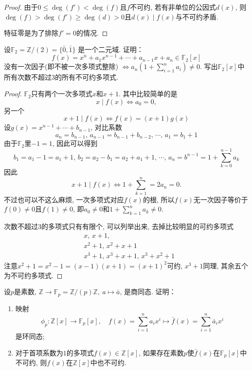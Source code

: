 \documentclass{../solutions-cn}
\begin{document}
\begin{proof}
    由于$0 \leqslant \deg(f') < \deg(f)$且$f$不可约, 若有非单位的公因式$d(x)$, 则$\deg(f) > \deg(f') \geqslant \deg(d) > 0$且$d(x) \mid f(x)$与不可约矛盾.

    特征零是为了排除$f' = 0$的情况.
\end{proof}

\begin{exercise}[习题2.3.5]
    设$\mathbb{F}_2 = \mathbb{Z}/(2) = \{\bar{0}, \bar{1}\}$
是一个二元域. 证明：
\[
    f(x) = x^n + a_1x^{n - 1} + \cdots + a_{n - 1}x + a_n \in \mathbb{F}_2[x]
\]
没有一次因子(即不被一次多项式整除)
\(
    \Leftrightarrow a_n\left(1 + \sum_{i = 1}^n a_i\right) \neq 0.
\)
写出$\mathbb{F}_2[x]$中所有次数不超过$3$的所有不可约多项式.
\end{exercise}

\begin{proof}
    $\mathbb{F}_2$只有两个一次多项式$x$和$x + 1$. 其中比较简单的是
    \[
        x \mid f(x) \iff a_0 = 0,
    \]
    另一个
    \[
        x + 1 \mid f(x) \iff f(x) = (x + 1)g(x)
    \]
    设$g(x) = x^{n - 1} + \cdots + b_{n - 1}$, 对比系数
    \[
        a_n = b_{n - 1},\, a_{n - 1} = b_{n - 1} + b_{n - 2},\, \cdots,\, a_{1} = b_1 + 1
    \]
    由于$\mathbb{F}_2$里$-1 = 1$, 因此可以得到
    \[
        b_1 = a_1 - 1 = a_1 + 1,\, b_2 = a_2 - b_1 = a_2 + a_1 + 1,\, \cdots,\, a_n = b^{n - 1} = 1 + \sum_{k = 0}^{n - 1} a_k
    \]
    因此
    \[
        x + 1 \mid f(x) \iff 1 + \sum_{k = 1}^{n} = 2a_n = 0.
    \]
    不过也可以不这么麻烦, 一次多项式对应$f(x)$的根, 所以$f(x)$无一次因子等价于$f(0) \neq 0$且$f(1) \neq 0$, 即$a_0 \neq 0$和$1 + \sum_{k = 1}^{n} a_k \neq 0$.

    次数不超过$3$的多项式只有有限个, 可以列举出来, 去掉比较明显的可约多项式
    \[
    \begin{aligned}
        &x,\, x + 1,\\
        &x^2 + 1,\, x^2 + x + 1\\
        &x^3 + 1,\, x^3 + x + 1,\, x^3 + x^2 + 1
    \end{aligned}
    \]
    注意$x^2 + 1 = x^2 - 1 = (x - 1)(x + 1) = (x + 1)^2$可约, $x^3 + 1$同理, 其余五个为不可约多项式.
\end{proof}

\begin{exercise}[习题2.3.6]
    设$p$是素数, $\mathbb{Z} \to \mathbb{F}_p = \mathbb{Z}/(p)\mathbb{Z},~a \mapsto \bar{a}$,
是商同态. 证明：
\begin{enumerate}[(1)]
    \item 映射
\[
    \phi_p:\mathbb{Z}[x] \to \mathbb{F}_p[x],\quad f(x) = \sum_{i = 1}^n a_ix^i \mapsto \bar{f}(x) = \sum_{i = 1}^n \bar{a}_ix^i
\]
是环同态;
    \item 对于首项系数为$1$的多项式$f(x) \in \mathbb{Z}[x]$,
如果存在素数$p$使$\bar{f}(x)$在$\mathbb{F}_p[x]$中不可约, 
则$f(x)$在$\mathbb{Z}[x]$中也不可约.
\end{enumerate}
\end{exercise}
\end{document}
